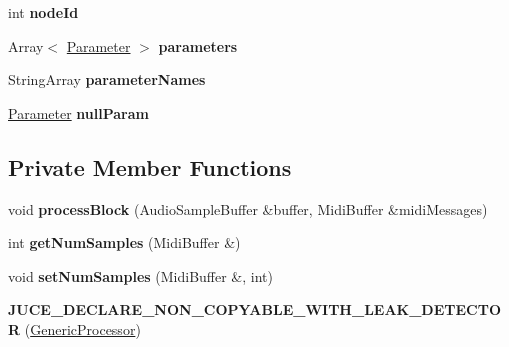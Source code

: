 \begin{DoxyCompactItemize}
\item 
\hypertarget{classGenericProcessor_a456658153f517e2e083134dcc4f6ec2a}{int {\bfseries node\-Id}}\label{classGenericProcessor_a456658153f517e2e083134dcc4f6ec2a}

\item 
\hypertarget{classGenericProcessor_a6cbe35e8fda628f79bdf246e37094af7}{Array$<$ \hyperlink{classParameter}{Parameter} $>$ {\bfseries parameters}}\label{classGenericProcessor_a6cbe35e8fda628f79bdf246e37094af7}

\item 
\hypertarget{classGenericProcessor_a7d2b1ae9789baa1804650c34ea555fb7}{String\-Array {\bfseries parameter\-Names}}\label{classGenericProcessor_a7d2b1ae9789baa1804650c34ea555fb7}

\item 
\hypertarget{classGenericProcessor_ab771cefa0d0e56f9d2d407cbd9f0b5bc}{\hyperlink{classParameter}{Parameter} {\bfseries null\-Param}}\label{classGenericProcessor_ab771cefa0d0e56f9d2d407cbd9f0b5bc}

\end{DoxyCompactItemize}
\subsection*{Private Member Functions}
\begin{DoxyCompactItemize}
\item 
\hypertarget{classGenericProcessor_ae7c809c188d64cc7a96c228cdb3d8e8f}{void {\bfseries process\-Block} (Audio\-Sample\-Buffer \&buffer, Midi\-Buffer \&midi\-Messages)}\label{classGenericProcessor_ae7c809c188d64cc7a96c228cdb3d8e8f}

\item 
\hypertarget{classGenericProcessor_a1406d9294c8cb4620b0bca29022a69ad}{int {\bfseries get\-Num\-Samples} (Midi\-Buffer \&)}\label{classGenericProcessor_a1406d9294c8cb4620b0bca29022a69ad}

\item 
\hypertarget{classGenericProcessor_afaeccbbd1bcd2b03b6645c48c6797124}{void {\bfseries set\-Num\-Samples} (Midi\-Buffer \&, int)}\label{classGenericProcessor_afaeccbbd1bcd2b03b6645c48c6797124}

\item 
\hypertarget{classGenericProcessor_a05bf8084cc6f77b3489757dcffb87c12}{{\bfseries J\-U\-C\-E\-\_\-\-D\-E\-C\-L\-A\-R\-E\-\_\-\-N\-O\-N\-\_\-\-C\-O\-P\-Y\-A\-B\-L\-E\-\_\-\-W\-I\-T\-H\-\_\-\-L\-E\-A\-K\-\_\-\-D\-E\-T\-E\-C\-T\-O\-R} (\hyperlink{classGenericProcessor}{Generic\-Processor})}\label{classGenericProcessor_a05bf8084cc6f77b3489757dcffb87c12}

\end{DoxyCompactItemize}
